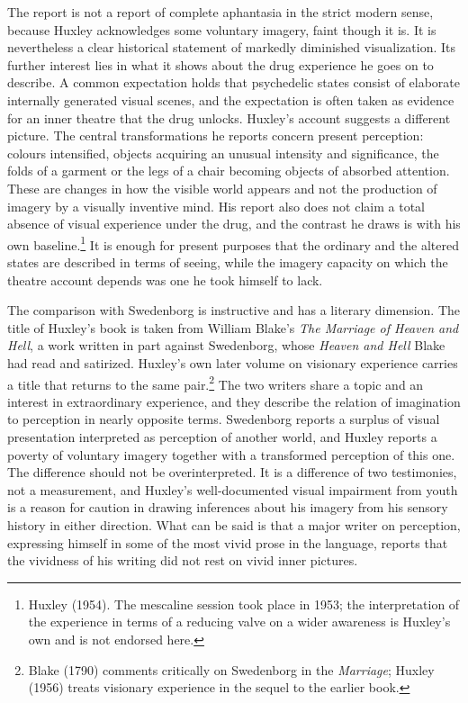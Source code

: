 \documentclass[11pt]{article}
\theoremstyle{remark}
\begin{document}
The report is not a report of complete aphantasia in the strict modern sense, because Huxley acknowledges some voluntary imagery, faint though it is. It is nevertheless a clear historical statement of markedly diminished visualization. Its further interest lies in what it shows about the drug experience he goes on to describe. A common expectation holds that psychedelic states consist of elaborate internally generated visual scenes, and the expectation is often taken as evidence for an inner theatre that the drug unlocks. Huxley's account suggests a different picture. The central transformations he reports concern present perception: colours intensified, objects acquiring an unusual intensity and significance, the folds of a garment or the legs of a chair becoming objects of absorbed attention. These are changes in how the visible world appears and not the production of imagery by a visually inventive mind. His report also does not claim a total absence of visual experience under the drug, and the contrast he draws is with his own baseline.\footnote{Huxley (1954). The mescaline session took place in 1953; the interpretation of the experience in terms of a reducing valve on a wider awareness is Huxley's own and is not endorsed here.} It is enough for present purposes that the ordinary and the altered states are described in terms of seeing, while the imagery capacity on which the theatre account depends was one he took himself to lack.

The comparison with Swedenborg is instructive and has a literary dimension. The title of Huxley's book is taken from William Blake's \emph{The Marriage of Heaven and Hell}, a work written in part against Swedenborg, whose \emph{Heaven and Hell} Blake had read and satirized. Huxley's own later volume on visionary experience carries a title that returns to the same pair.\footnote{Blake (1790) comments critically on Swedenborg in the \emph{Marriage}; Huxley (1956) treats visionary experience in the sequel to the earlier book.} The two writers share a topic and an interest in extraordinary experience, and they describe the relation of imagination to perception in nearly opposite terms. Swedenborg reports a surplus of visual presentation interpreted as perception of another world, and Huxley reports a poverty of voluntary imagery together with a transformed perception of this one. The difference should not be overinterpreted. It is a difference of two testimonies, not a measurement, and Huxley's well-documented visual impairment from youth is a reason for caution in drawing inferences about his imagery from his sensory history in either direction. What can be said is that a major writer on perception, expressing himself in some of the most vivid prose in the language, reports that the vividness of his writing did not rest on vivid inner pictures.
\end{document}
